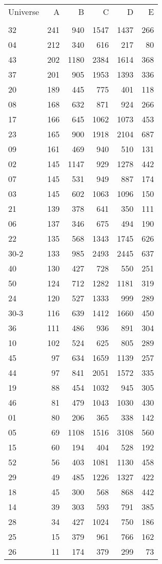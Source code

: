 \begin{tabular}{lrrrrr}
\toprule
Universe & A & B & C & D & E \\
 &  &  &  &  &  \\
\midrule
32 & 241 & 940 & 1547 & 1437 & 266 \\
04 & 212 & 340 & 616 & 217 & 80 \\
43 & 202 & 1180 & 2384 & 1614 & 368 \\
37 & 201 & 905 & 1953 & 1393 & 336 \\
20 & 189 & 445 & 775 & 401 & 118 \\
08 & 168 & 632 & 871 & 924 & 266 \\
17 & 166 & 645 & 1062 & 1073 & 453 \\
23 & 165 & 900 & 1918 & 2104 & 687 \\
09 & 161 & 469 & 940 & 510 & 131 \\
02 & 145 & 1147 & 929 & 1278 & 442 \\
07 & 145 & 531 & 949 & 887 & 174 \\
03 & 145 & 602 & 1063 & 1096 & 150 \\
21 & 139 & 378 & 641 & 350 & 111 \\
06 & 137 & 346 & 675 & 494 & 190 \\
22 & 135 & 568 & 1343 & 1745 & 626 \\
30-2 & 133 & 985 & 2493 & 2445 & 637 \\
40 & 130 & 427 & 728 & 550 & 251 \\
50 & 124 & 712 & 1282 & 1181 & 319 \\
24 & 120 & 527 & 1333 & 999 & 289 \\
30-3 & 116 & 639 & 1412 & 1660 & 450 \\
36 & 111 & 486 & 936 & 891 & 304 \\
10 & 102 & 524 & 625 & 805 & 289 \\
45 & 97 & 634 & 1659 & 1139 & 257 \\
44 & 97 & 841 & 2051 & 1572 & 335 \\
19 & 88 & 454 & 1032 & 945 & 305 \\
46 & 81 & 479 & 1043 & 1030 & 430 \\
01 & 80 & 206 & 365 & 338 & 142 \\
05 & 69 & 1108 & 1516 & 3108 & 560 \\
15 & 60 & 194 & 404 & 528 & 192 \\
52 & 56 & 403 & 1081 & 1130 & 458 \\
29 & 49 & 485 & 1226 & 1327 & 422 \\
18 & 45 & 300 & 568 & 868 & 442 \\
14 & 39 & 303 & 593 & 791 & 385 \\
28 & 34 & 427 & 1024 & 750 & 186 \\
25 & 15 & 379 & 961 & 766 & 162 \\
26 & 11 & 174 & 379 & 299 & 73 \\
\end{tabular}
